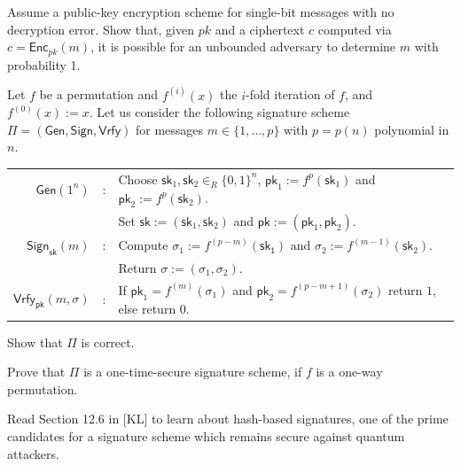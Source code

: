 \documentclass[a4paper,10pt,landscape,twocolumn]{scrartcl}
\begin{document}
\newpage

\begin{bonusexercise}
	Assume a public-key encryption scheme for single-bit messages with no
	decryption error. Show that, given $pk$ and a ciphertext $c$ computed via
	$c=\mathsf{Enc}_{pk}(m)$, it is possible for an unbounded adversary to determine
	$m$ with probability 1.
\end{bonusexercise}


\begin{bonusexercise}
Let $f$ be a permutation and $f^{(i)}(x)$ the $i$-fold iteration of $f$,
and $f^{(0)}(x) := x$. Let us consider the following signature scheme
$\Pi = (\mathsf{Gen},\mathsf{Sign},\mathsf{Vrfy})$ for messages $m \in \{1, \ldots, p\}$ with $p = p(n)$ polynomial in $n$.
\begin{center}\vspace{-1em}
\begin{tabular}{rcl}
  $\mathsf{Gen}(1^n)$ & : &
    Choose $\mathsf{sk}_1,\mathsf{sk}_2 \in_R \{0,1\}^n$, $\mathsf{pk}_1 := f^p(\mathsf{sk}_1)$ and $\mathsf{pk}_2 := f^p(\mathsf{sk}_2)$. \\
    & & Set $\mathsf{sk} := (\mathsf{sk}_1,\mathsf{sk}_2)$ and $\mathsf{pk} := (\mathsf{pk}_1,\mathsf{pk}_2)$.\\[5pt]
  $\mathsf{Sign}_{\mathsf{sk}}(m)$ & : &
    Compute $\sigma_1 := f^{(p-m)}(\mathsf{sk_1})$ and $\sigma_2 := f^{(m-1)}(\mathsf{sk}_2)$.\\
    && Return $\sigma := (\sigma_1,\sigma_2)$.\\[5pt]
  $\mathsf{Vrfy}_{\mathsf{pk}}(m,\sigma)$ & : &
    If $\mathsf{pk}_1 =
  f^{(m)}(\sigma_1)$ and $\mathsf{pk}_2 = f^{(p-m+1)}(\sigma_2)$ return $1$,
  else return $0$.
\end{tabular}
\end{center}
\begin{subex}
Show that $\Pi$ is correct.
\end{subex}
\begin{subex}
Prove that $\Pi$ is a one-time-secure signature scheme, if
  $f$ is a one-way permutation.
\end{subex}
\end{bonusexercise}

\begin{bonusexercise}
Read Section 12.6 in [KL] to learn about hash-based signatures, one of the prime candidates for a signature scheme which remains secure against quantum attackers.
\end{bonusexercise}
\end{document}
